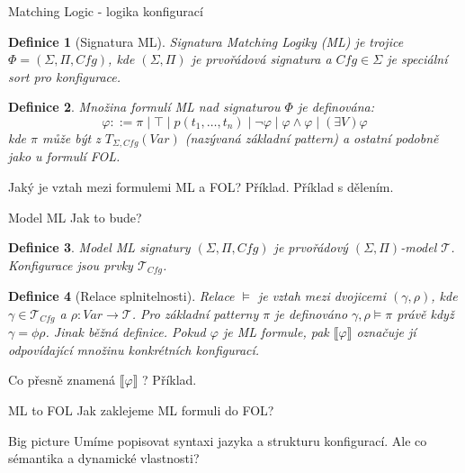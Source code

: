 \documentclass[11pt]{beamer}
\newtheorem{dfn}{Definice}
\newcommand{\Var}{\mathit{Var}}
\newcommand{\folSignature}{\ensuremath{\left( \Sigma, \Pi \right)}}
\newcommand{\mlSignature}{\ensuremath{\left( \Sigma, \Pi, \mathit{Cfg} \right)}}
\newcommand{\Tcfg}{\ensuremath{\mathcal{T}_{\mathit{Cfg}}}}
\begin{document}
\begin{frame}{Matching Logic - logika konfigurací}


\begin{dfn}[Signatura ML]
Signatura Matching Logiky (ML) je trojice $\Phi = \mlSignature$,
kde $\left( \Sigma, \Pi \right)$ je prvořádová signatura a $\mathit{Cfg} \in \Sigma$ je speciální sort pro konfigurace.
\end{dfn}

\pause

\begin{dfn}
Množina formulí ML nad signaturou $\Phi$ je definována:
\begin{equation*}
\varphi ::= \pi \mid \top \mid p(t_1,\ldots,t_n) \mid \neg \varphi \mid \varphi \land \varphi \mid \left( \exists V \right) \varphi
\end{equation*}
kde $\pi$ může být z $T_{\Sigma, \mathit{Cfg}}\left( Var \right)$ (nazývaná základní pattern) a ostatní podobně jako u formulí FOL.
\end{dfn}

\pause
Jaký je vztah mezi formulemi ML a FOL?
\pause
Příklad.
\pause
Příklad s dělením.

\end{frame}

\begin{frame}{Model ML}
Jak to bude?
\pause
\begin{dfn}
Model ML signatury $\mlSignature$ je prvořádový $\folSignature$-model $\mathcal{T}$. Konfigurace jsou prvky $\Tcfg$.
\end{dfn}

\pause

\begin{dfn}[Relace splnitelnosti]
Relace $\models$ je vztah mezi dvojicemi $\left( \gamma, \rho \right)$, kde $\gamma \in \Tcfg$
a $\rho : \Var \rightarrow \mathcal{T}$. Pro základní patterny $\pi$ je definováno $\gamma, \rho \models \pi$ právě když $\gamma = \phi \rho$. Jinak běžná definice. Pokud $\varphi$ je ML formule, pak $\llbracket \varphi \rrbracket$ označuje jí odpovídající množinu konkrétních konfigurací.
\end{dfn}
\pause
Co přesně znamená $\llbracket \varphi \rrbracket$ ?
\pause
Příklad.
\end{frame}

\begin{frame}{ML to FOL}
Jak zaklejeme ML formuli do FOL?
\end{frame}


\begin{frame}{Big picture}
Umíme popisovat syntaxi jazyka a strukturu konfigurací.
\pause
Ale co sémantika a dynamické vlastnosti?
\end{frame}
\end{document}
